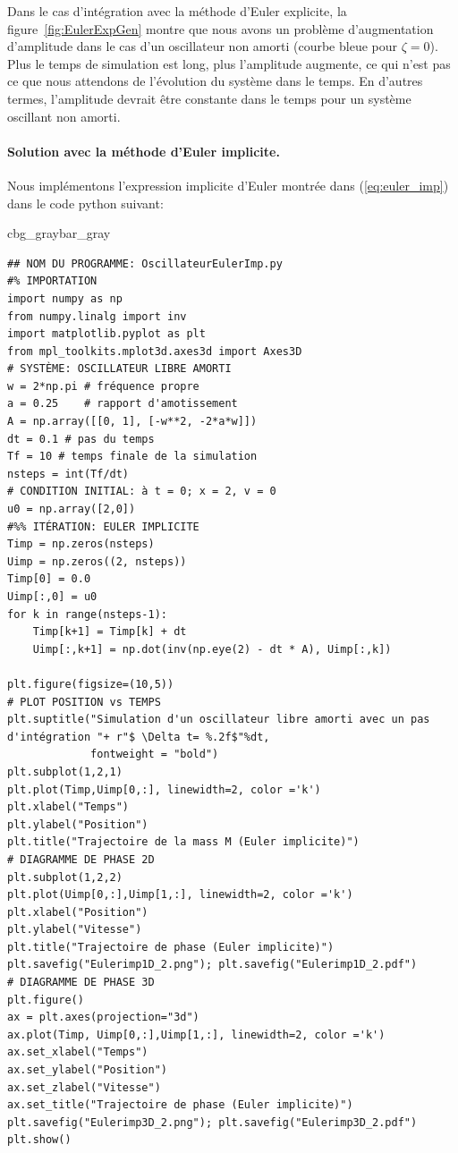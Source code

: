 \documentclass[%
oneside,                 %
final,                   %
10pt]{article}
\newenvironment{_pro_tight}[2]{
   \def\FrameCommand{\color{#2}\vrule width 1mm\normalcolor\colorbox{#1}}
   \FrameRule0.6pt\MakeFramed {\advance\hsize-2mm\FrameRestore}\vskip3mm}
   {\vskip0mm\endMakeFramed}
\newenvironment{pro}[2]{
\bgroup\rmfamily
\fboxsep=0mm\relax
\begin{_pro_tight}{#1}{#2}
\list{}{\parsep=-2mm\parskip=0mm\topsep=0pt\leftmargin=2mm
\rightmargin=2\leftmargin\leftmargin=4pt\relax}
\item\relax}
{\endlist\end{_pro_tight}\egroup}
\begin{document}
Dans le cas d'intégration avec la méthode d'Euler explicite, la figure~\ref{fig:EulerExpGen} montre que nous avons un problème d’augmentation d’amplitude dans le cas d’un oscillateur non amorti (courbe bleue pour $\zeta = 0$). Plus le temps de simulation est long, plus l'amplitude augmente, ce qui n'est pas ce que nous attendons de l'évolution du système dans le temps. En d’autres termes, l’amplitude devrait être constante dans le temps pour un système oscillant non amorti.

\paragraph{Solution avec la méthode d'Euler implicite.}
Nous implémentons l'expression implicite d'Euler montrée dans (\ref{eq:euler_imp}) dans le code python suivant:
\begin{pro}{cbg_gray}{bar_gray}\begin{verbatim}
## NOM DU PROGRAMME: OscillateurEulerImp.py
#% IMPORTATION
import numpy as np
from numpy.linalg import inv
import matplotlib.pyplot as plt
from mpl_toolkits.mplot3d.axes3d import Axes3D
# SYSTÈME: OSCILLATEUR LIBRE AMORTI
w = 2*np.pi # fréquence propre
a = 0.25    # rapport d'amotissement
A = np.array([[0, 1], [-w**2, -2*a*w]])
dt = 0.1 # pas du temps
Tf = 10 # temps finale de la simulation
nsteps = int(Tf/dt)
# CONDITION INITIAL: à t = 0; x = 2, v = 0
u0 = np.array([2,0])
#%% ITÉRATION: EULER IMPLICITE
Timp = np.zeros(nsteps)
Uimp = np.zeros((2, nsteps))
Timp[0] = 0.0
Uimp[:,0] = u0
for k in range(nsteps-1):
    Timp[k+1] = Timp[k] + dt
    Uimp[:,k+1] = np.dot(inv(np.eye(2) - dt * A), Uimp[:,k])

plt.figure(figsize=(10,5))
# PLOT POSITION vs TEMPS
plt.suptitle("Simulation d'un oscillateur libre amorti avec un pas d'intégration "+ r"$ \Delta t= %.2f$"%dt,
             fontweight = "bold")
plt.subplot(1,2,1)
plt.plot(Timp,Uimp[0,:], linewidth=2, color ='k')
plt.xlabel("Temps")
plt.ylabel("Position")
plt.title("Trajectoire de la mass M (Euler implicite)")
# DIAGRAMME DE PHASE 2D
plt.subplot(1,2,2)
plt.plot(Uimp[0,:],Uimp[1,:], linewidth=2, color ='k')
plt.xlabel("Position")
plt.ylabel("Vitesse")
plt.title("Trajectoire de phase (Euler implicite)")
plt.savefig("Eulerimp1D_2.png"); plt.savefig("Eulerimp1D_2.pdf")
# DIAGRAMME DE PHASE 3D
plt.figure()
ax = plt.axes(projection="3d")
ax.plot(Timp, Uimp[0,:],Uimp[1,:], linewidth=2, color ='k')
ax.set_xlabel("Temps")
ax.set_ylabel("Position")
ax.set_zlabel("Vitesse")
ax.set_title("Trajectoire de phase (Euler implicite)")
plt.savefig("Eulerimp3D_2.png"); plt.savefig("Eulerimp3D_2.pdf")
plt.show()
\end{verbatim}
\end{pro}
\noindent
\end{document}
